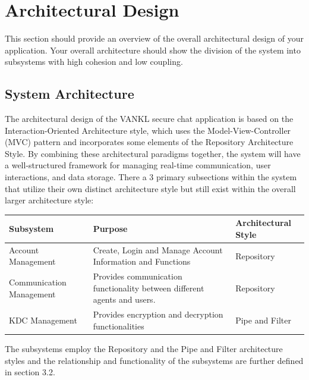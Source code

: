 \documentclass[]{article}
\begin{document}


\section{Architectural Design}
\label{sec:architectural_design}
This section should provide an overview of the overall architectural design of your application. Your overall architecture should show the division of the system into subsystems with high cohesion and low coupling.

\subsection{System Architecture}
\label{sub:system_architecture}
The architectural design of the VANKL secure chat application is based on the Interaction-Oriented Architecture style, which uses the Model-View-Controller (MVC) pattern and incorporates some elements of the Repository Architecture Style. By combining these architectural paradigms together, the system will have a well-structured framework for managing real-time communication, user interactions, and data storage.
\newline\newline
There a 3 primary subsections within the system that utilize their own distinct architecture style but still exist within the overall larger architecture style:
\begin{center}
	\begin{tabular}{|p{2in} | p{2in}| p{2in}|}
		\hline
		Subsystem                & Purpose                                                                  & Architectural Style \\
		\hline
		Account Management       & Create, Login and Manage Account Information and Functions               & Repository          \\
		\hline
		Communication Management & Provides communication functionality between different agents and users. & Repository          \\
		\hline
		KDC Management           & Provides encryption and decryption functionalities                       & Pipe and Filter     \\
		\hline
	\end{tabular}
\end{center}
The subsystems employ the Repository and the Pipe and Filter architecture styles and the relationship and functionality of the subsystems are further defined in section 3.2.
\end{document}
